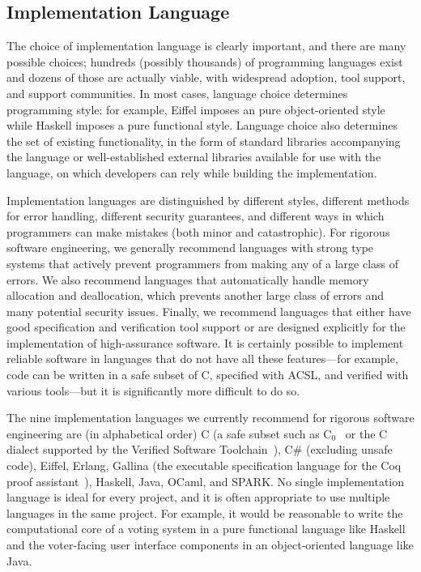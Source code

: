 \subsection{Implementation Language}

The choice of implementation language is clearly important, and there
are many possible choices; hundreds (possibly thousands) of
programming languages exist and dozens of those are actually viable,
with widespread adoption, tool support, and support communities. In
most cases, language choice determines programming style: for example,
Eiffel imposes an pure object-oriented style while Haskell imposes a
pure functional style. Language choice also determines the set of
existing functionality, in the form of standard libraries accompanying
the language or well-established external libraries available for use
with the language, on which developers can rely while building the
implementation. 

Implementation languages are distinguished by different styles,
different methods for error handling, different security guarantees,
and different ways in which programmers can make mistakes (both minor
and catastrophic). For rigorous software engineering, we generally
recommend languages with strong type systems that actively prevent
programmers from making any of a large class of errors. We also
recommend languages that automatically handle memory allocation and
deallocation, which prevents another large class of errors and many
potential security issues. Finally, we recommend languages that either
have good specification and verification tool support or are designed
explicitly for the implementation of high-assurance software. It is
certainly possible to implement reliable software in languages that do
not have all these features---for example, code can be written in a
safe subset of C, specified with ACSL, and verified with various
tools---but it is significantly more difficult to do so.

The nine implementation languages we currently recommend for rigorous
software engineering are (in alphabetical order) C (a safe subset such
as C$_{0}$~\cite{C0} or the C dialect supported by the Verified
Software Toolchain~\cite{VST}), C\# (excluding unsafe code), Eiffel,
Erlang, Gallina (the executable specification language for the Coq
proof assistant~\cite{Coq}), Haskell, Java, OCaml, and SPARK. No
single implementation language is ideal for every project, and it is
often appropriate to use multiple languages in the same project. For
example, it would be reasonable to write the computational core of a
voting system in a pure functional language like Haskell and the
voter-facing user interface components in an object-oriented language
like Java.

